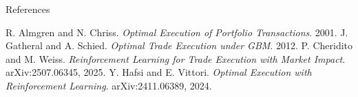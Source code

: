 \documentclass[11pt,aspectratio=169]{beamer}   %
\begin{document}
\begin{frame}[allowframebreaks]{References}
		\tiny
		
		\begin{thebibliography}{9}
			 R. Almgren and N. Chriss. \emph{Optimal Execution of Portfolio Transactions}. 2001.
			 J. Gatheral and A. Schied. \emph{Optimal Trade Execution under GBM}. 2012.
			 P. Cheridito and M. Weiss. \emph{Reinforcement Learning for Trade Execution with Market Impact}. arXiv:2507.06345, 2025.
			 Y. Hafsi and E. Vittori. \emph{Optimal Execution with Reinforcement Learning}. arXiv:2411.06389, 2024.
		\end{thebibliography}
\end{frame}
\end{document}
